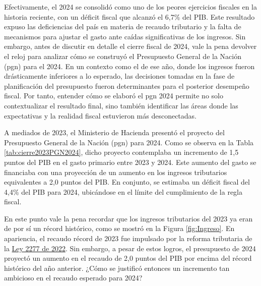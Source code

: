 Efectivamente, el 2024 se consolidó como uno de los peores ejercicios fiscales en la historia reciente, con un déficit fiscal que alcanzó el 6,7\% del PIB. Este resultado expuso las deficiencias del país en materia de recaudo tributario y la falta de mecanismos para ajustar el gasto ante caídas significativas de los ingresos. Sin embargo, antes de discutir en detalle el cierre fiscal de 2024, vale la pena devolver el reloj para analizar cómo se construyó el Presupuesto General de la Nación (\gls{pgn}) para el 2024. En un contexto como el de ese año, donde los ingresos fueron drásticamente inferiores a lo esperado, las decisiones tomadas en la fase de planificación del presupuesto fueron determinantes para el posterior desempeño fiscal. Por tanto, entender cómo se elaboró el \gls{pgn} 2024 permite no solo contextualizar el resultado final, sino también identificar las áreas donde las expectativas y la realidad fiscal estuvieron más desconectadas.



A mediados de 2023, el Ministerio de Hacienda presentó el proyecto del Presupuesto General de la Nación (\gls{pgn}) para 2024. Como se observa en la Tabla \ref{tab:cierre2023PGN2024}, dicho proyecto contemplaba un incremento de 1,5 puntos del PIB en el gasto primario entre 2023 y 2024. Este aumento del gasto se financiaba con una proyección de un aumento en los ingresos tributarios equivalentes a 2,0 puntos del PIB. En conjunto, se estimaba un déficit fiscal del 4,4\% del PIB para 2024, ubicándose en el límite del cumplimiento de la regla fiscal.

En este punto vale la pena recordar que los ingresos tributarios del 2023 ya eran de por sí un récord histórico, como se mostró en la Figura \ref{fig:Ingreso}. En apariencia, el recaudo récord de 2023 fue impulsado por la reforma tributaria de la \href{https://www.funcionpublica.gov.co/eva/gestornormativo/norma.php?i=199883}{Ley 2277 de 2022}. Sin embargo, a pesar de estos logros, el presupuesto de 2024 proyectó un aumento en el recaudo de 2,0 puntos del PIB por encima del récord histórico del año anterior. ¿Cómo se justificó entonces un incremento tan ambicioso en el recaudo esperado para 2024?

